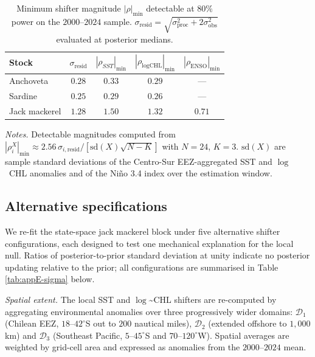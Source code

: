 \documentclass[
  11pt,
]{article}
\begin{document}
\begin{table}[H]
\centering
\caption{Minimum shifter magnitude $|\rho|_{\min}$ detectable at
$80\%$ power on the $2000$--$2024$ sample.
$\sigma_{\text{resid}} = \sqrt{\sigma_{\text{proc}}^2 + 2\sigma_{\text{obs}}^2}$
evaluated at posterior medians.\label{tab:appE-power}}
\begin{threeparttable}
\begin{tabular}{lcccc}
\toprule
Stock & $\sigma_{\text{resid}}$ & $|\rho_{SST}|_{\min}$ & $|\rho_{\log\text{CHL}}|_{\min}$ & $|\rho_{\text{ENSO}}|_{\min}$ \\
\midrule
Anchoveta & $0.28$ & $0.33$ & $0.29$ & ---     \\
Sardine & $0.25$ & $0.29$ & $0.26$ & ---     \\
Jack mackerel & $1.28$ & $1.50$ & $1.32$ & $0.71$ \\
\bottomrule
\end{tabular}
\begin{tablenotes}[flushleft]\footnotesize
\item \emph{Notes.} Detectable magnitudes computed from
$|\rho_i^X|_{\min} \approx 2.56\,\sigma_{i,\text{resid}} / [\mathrm{sd}(X)\sqrt{N-K}]$
with $N=24$, $K=3$. $\mathrm{sd}(X)$ are sample standard deviations of
the Centro-Sur EEZ-aggregated SST and $\log$~CHL anomalies and of the
Niño 3.4 index over the estimation window.
\end{tablenotes}
\end{threeparttable}
\end{table}

\subsection{Alternative specifications}\label{sec:appendix-spatial-results}

We re-fit the state-space jack mackerel block under five alternative
shifter configurations, each designed to test one mechanical
explanation for the local null. Ratios of posterior-to-prior standard
deviation at unity indicate no posterior updating relative to the prior;
all configurations are summarised in Table \ref{tab:appE-sigma} below.

\emph{Spatial extent.} The local SST and \(\log\)\textasciitilde CHL shifters are
re-computed by aggregating environmental anomalies over three
progressively wider domains: \(\mathcal{D}_1\) (Chilean EEZ,
\(18\)--\(42^{\circ}\)S out to \(200\) nautical miles), \(\mathcal{D}_2\)
(extended offshore to \(1{,}000\) km) and \(\mathcal{D}_3\) (Southeast
Pacific, \(5\)--\(45^{\circ}\)S and \(70\)--\(120^{\circ}\)W). Spatial
averages are weighted by grid-cell area and expressed as anomalies
from the \(2000\)--\(2024\) mean.
\end{document}
